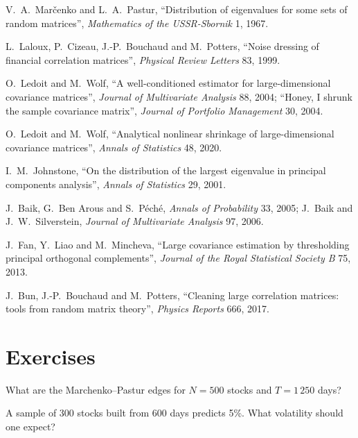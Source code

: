 \begin{omsources}
\item V.~A.~Marčenko and L.~A.~Pastur, ``Distribution of eigenvalues for some sets of random matrices'', \emph{Mathematics of the USSR-Sbornik} 1, 1967.
\item L.~Laloux, P.~Cizeau, J.-P.~Bouchaud and M.~Potters, ``Noise dressing of financial correlation matrices'', \emph{Physical Review Letters} 83, 1999.
\item O.~Ledoit and M.~Wolf, ``A well-conditioned estimator for large-dimensional covariance matrices'', \emph{Journal of Multivariate Analysis} 88, 2004; ``Honey, I shrunk the sample
covariance matrix'', \emph{Journal of Portfolio Management} 30, 2004.
\item O.~Ledoit and M.~Wolf, ``Analytical nonlinear shrinkage of large-dimensional covariance matrices'', \emph{Annals of Statistics} 48, 2020.
\item I.~M.~Johnstone, ``On the distribution of the largest eigenvalue in principal components analysis'', \emph{Annals of Statistics} 29, 2001.
\item J.~Baik, G.~Ben Arous and S.~Péché, \emph{Annals of Probability} 33, 2005; J.~Baik and J.~W.~Silverstein, \emph{Journal of Multivariate Analysis} 97, 2006.
\item J.~Fan, Y.~Liao and M.~Mincheva, ``Large covariance estimation by thresholding principal orthogonal complements'', \emph{Journal of the Royal Statistical Society B} 75, 2013.
\item J.~Bun, J.-P.~Bouchaud and M.~Potters, ``Cleaning large correlation matrices: tools from random matrix theory'', \emph{Physics Reports} 666, 2017.
\end{omsources}

\section{Exercises}

\begin{exercise}[$\star$]\label{exo:qm:covariance-estimation-and-random-matrices:1}
What are the Marchenko--Pastur edges for $N = 500$ stocks and $T = 1\,250$ days?
\end{exercise}

\begin{exercise}[$\star$]\label{exo:qm:covariance-estimation-and-random-matrices:2}
A sample  of 300 stocks built from 600 days predicts 5\%. What volatility should one expect?
\end{exercise}

